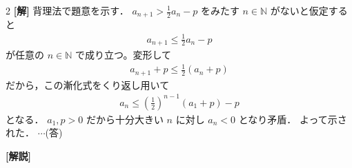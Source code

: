 \documentclass[../../../../main.tex]{subfiles}
\begin{document}
\setcounter{equation}{0}
\begin{oframed}
  
\end{oframed}
\setlength{\columnseprule}{0.4pt}
\begin{multicols}{2}
  {\bf[解]}
  背理法で題意を示す．
  $a_{n+1} > \frac{1}{2} a_n - p$ をみたす $n \in \mathbb{N}$ がないと仮定すると
  \begin{align*}
    a_{n+1} \le \frac{1}{2} a_n - p
  \end{align*}
  が任意の $n \in \mathbb{N}$ で成り立つ。変形して
  \begin{align*}
    a_{n+1} + p \le \frac{1}{2} (a_n + p)
  \end{align*}
  だから，この漸化式をくり返し用いて
  \begin{align*}
    a_n \le \left(\frac{1}{2}\right)^{n-1} (a_1 + p) - p
  \end{align*}
  となる．
  $a_1, p > 0$ だから十分大きい $n$ に対し $a_n < 0$ となり矛盾．
  よって示された．
  $\cdots$(答)

  \vspace{10pt}
  {\bf[解説]}

  \newpage
\end{multicols}
\end{document}
